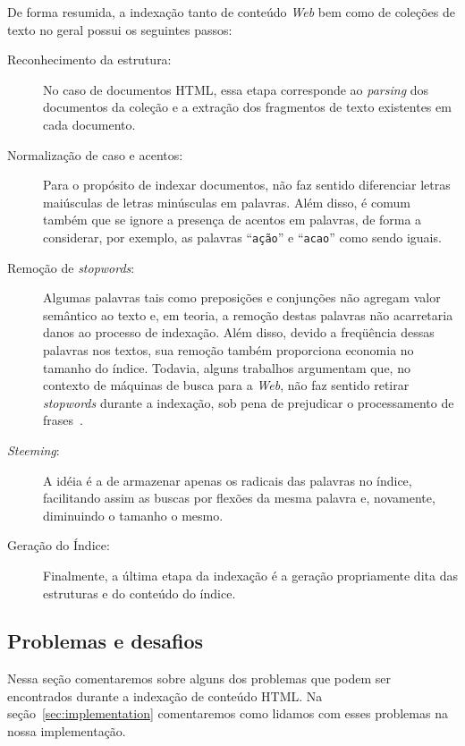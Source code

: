 \documentclass[10pt,twocolumn]{article}
\begin{document}
De forma resumida, a indexação tanto de conteúdo \emph{Web} bem como 
de coleções de texto no geral possui os seguintes passos:

\begin{description}

\item[Reconhecimento da estrutura:] No caso de documentos HTML, essa
etapa corresponde ao \emph{parsing} dos documentos da coleção e a
extração dos fragmentos de texto existentes em cada documento.

\item[Normalização de caso e acentos:] Para o propósito de indexar
documentos, não faz sentido diferenciar letras maiúsculas de letras
minúsculas em palavras. Além disso, é comum também que se ignore a
presença de acentos em palavras, de forma a considerar, por exemplo,
 as palavras ``\texttt{ação}'' e ``\texttt{acao}'' como sendo iguais.

\item[Remoção de \emph{stopwords}:] Algumas palavras tais como
preposições e conjunções não agregam valor semântico ao texto e, em
teoria, a remoção destas palavras não acarretaria danos ao processo de
indexação. Além disso, devido a freqüência dessas palavras nos textos,
sua remoção também proporciona economia no tamanho do índice. Todavia,
alguns trabalhos argumentam que, no contexto de máquinas de busca para a
\emph{Web}, não faz sentido retirar \emph{stopwords} durante a
indexação, sob pena de prejudicar o processamento de
frases~\cite{moffat1999managing}.

\item[\emph{Steeming}:] A idéia é a de armazenar apenas os radicais das
palavras no índice, facilitando assim as buscas por flexões da mesma
palavra e, novamente, diminuindo o tamanho o mesmo.

\item[Geração do Índice:] Finalmente, a última etapa da indexação é a
geração propriamente dita das estruturas e do conteúdo do índice. 

\end{description}

\subsection{Problemas e desafios}

Nessa seção comentaremos sobre alguns dos problemas que podem ser
encontrados durante a indexação de conteúdo HTML. Na
seção~\ref{sec:implementation} comentaremos como lidamos com esses
problemas na nossa implementação.
\end{document}
